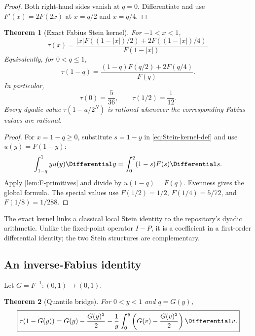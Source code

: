 \documentclass[11pt,a4paper]{article}
\newtheorem{theorem}{Theorem}[section]
\theoremstyle{definition}
\theoremstyle{remark}
\begin{document}
\begin{proof}
Both right-hand sides vanish at $q=0$. Differentiate and use $F'(x)=2F(2x)$ at $x=q/2$ and $x=q/4$.
\end{proof}

\begin{theorem}[Exact Fabius Stein kernel]
\label{thm:exact-tau}
For $-1<x<1$,
\begin{equation}
 \boxed{\displaystyle
 \tau(x)=
 \frac{|x|F((1-|x|)/2)+2F((1-|x|)/4)}{F(1-|x|)}.}
 \label{eq:tau-global}
\end{equation}
Equivalently, for $0<q\le1$,
\begin{equation}
 \boxed{\displaystyle
 \tau(1-q)=
 \frac{(1-q)F(q/2)+2F(q/4)}{F(q)}.}
 \label{eq:tau-q}
\end{equation}
In particular,
\begin{equation}
 \tau(0)=\frac5{36},
 \qquad
 \tau(1/2)=\frac1{12}.
 \label{eq:tau-special}
\end{equation}
Every dyadic value $\tau(1-a/2^N)$ is rational whenever the corresponding Fabius values are rational.
\end{theorem}

\begin{proof}
For $x=1-q\ge0$, substitute $s=1-y$ in \eqref{eq:Stein-kernel-def} and use $u(y)=F(1-y)$:
\[
 \int_{1-q}^{1}yu(y)\Differential y
 =\int_0^q(1-s)F(s)\Differential s.
\]
Apply \cref{lem:F-primitives} and divide by $u(1-q)=F(q)$. Evenness gives the global formula. The special values use $F(1/2)=1/2$, $F(1/4)=5/72$, and $F(1/8)=1/288$.
\end{proof}

The exact kernel links a classical local Stein identity to the repository's dyadic arithmetic. Unlike the fixed-point operator $I-P$, it is a coefficient in a first-order differential identity; the two Stein structures are complementary.

\subsection{An inverse-Fabius identity}

Let $G=F^{-1}:(0,1)\to(0,1)$.

\begin{theorem}[Quantile bridge]
\label{thm:tau-quantile}
For $0<y<1$ and $q=G(y)$,
\begin{equation}
 \boxed{\displaystyle
 \tau(1-G(y))
 =G(y)-\frac{G(y)^2}{2}
 -\frac1y\int_0^y
 \left(G(v)-\frac{G(v)^2}{2}\right)\Differential v.}
 \label{eq:tau-quantile}
\end{equation}
\end{theorem}
\end{document}
